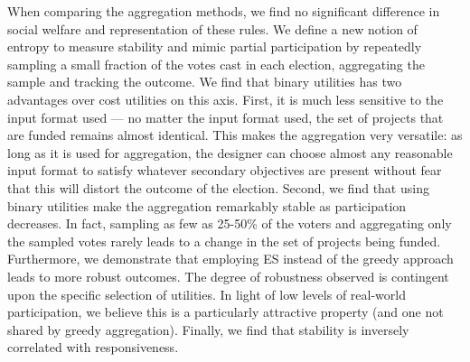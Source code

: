 \documentclass[mnsc,blindrev]{informs3_freeuse} %
\newcommand{\kibitz}[2]{\ifnum\Comments=1{\color{#1}{#2}}\fi}
\newcommand{\rf}[1]{\kibitz{blue}{[Roy says:#1]}}
\newcommand{\gb}[1]{\kibitz{red}{[GB:#1]}}
\newcommand{\mes}{ES}
\begin{document}
When comparing the aggregation methods, we find no significant difference in   social welfare and representation of these rules.  
We define a new notion of entropy to measure stability and 
mimic partial participation by repeatedly sampling a small fraction of the  votes cast in each election, aggregating the sample and tracking the outcome. %
We find that binary utilities has two advantages over cost utilities on this axis. 
First, it is much less sensitive to the input format used --- no matter the input format used, the set of projects that are funded remains almost identical. This makes the aggregation very versatile: as long as it is used for aggregation, the designer can choose almost any reasonable input format to satisfy whatever secondary objectives are present without fear that this will distort the outcome of the election. 
Second, we find that using binary utilities make the aggregation remarkably stable as participation decreases. In fact, sampling as few as 25-50\%  
of the voters and aggregating only the sampled votes rarely leads to a change in the set of projects being funded. 
Furthermore, we demonstrate that employing \mes{} instead of the greedy approach leads to more robust outcomes. The degree of robustness observed is contingent upon the specific selection of utilities.
In light of low levels of real-world participation, we believe this is a particularly attractive property (and one  not shared by greedy aggregation). 
Finally, we find that stability is inversely correlated with responsiveness.

\gb{}
\end{document}
